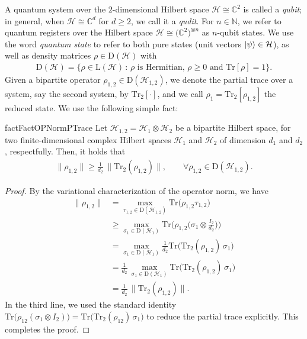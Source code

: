 \documentclass[a4paper,onecolumn,11pt]{quantumarticle}
\theoremstyle{plain}
\begin{document}
A quantum system over the $2$-dimensional Hilbert space $\mathcal H \cong \mathbb{C}^2$ is called a \emph{qubit}; in general, when $\mathcal H \cong \mathbb{C}^d$ for $d \geq 2$, we call it a \emph{qudit}. For $n \in \mathbb{N}$, we refer to quantum registers over the Hilbert space $\mathcal H \cong \big(\mathbb{C}^2\big)^{\otimes n}$ as $n$-qubit states. We use the word \emph{quantum state} to refer to both pure states (unit vectors $\ket{\psi} \in \mathcal H$), as well as density matrices $\rho \in \mathrm{D}(\mathcal H)$ with
\begin{align}
\mathrm{D}(\mathcal H) = \{ \rho \in \mathrm{L}(\mathcal{H}) \, : \, \rho \text{ is Hermitian, $\rho \geq 0$ and  } \mathrm{Tr}[\rho] =1\}.    
\end{align}
Given a bipartite operator $\rho_{1,2} \in \mathrm{D}(\mathcal H_{1,2})$, we denote the partial trace over a system, say the second system, by $\mathrm{Tr}_2[\cdot]$, and we call $\rho_1=\mathrm{Tr}_2[\rho_{1,2}]$ the reduced state. We use the following simple fact:
\begin{restatable}{fact}{FactOPNormPTrace} \label{fact:op-norm-ptrace}
    Let $\mathcal H_{1,2} = \mathcal H_{1} \otimes \mathcal H_{2}$ be a bipartite Hilbert space, for two finite-dimensional complex Hilbert spaces $\mathcal H_{1}$ and $\mathcal H_{2}$ of dimension $d_1$ and $d_2$, respectfully. Then, it holds that
    \begin{align}
        \|\rho_{1,2}\| \geq \frac{1}{d_2} \, \|\mathrm{Tr}_2(\rho_{1,2})\|, \quad \quad \forall \rho_{1,2} \in \mathrm{D}(\mathcal H_{1,2}).
        \end{align}
\end{restatable}

\begin{proof}
By the variational characterization of the operator norm, we have
\begin{align*}
\|\rho_{1,2}\| 
&= \max_{\tau_{1,2} \in \mathrm{D}(\mathcal H_{1,2})} \mathrm{Tr}\big(\rho_{1,2} \tau_{1,2}\big) \\
&\ge \max_{\sigma_1 \in \mathrm{D}(\mathcal H_1)} \mathrm{Tr}\Big(\rho_{1,2} \big(\sigma_1 \otimes \frac{I_2}{d_2}\big)\Big) \\
&= \max_{\sigma_1 \in \mathrm{D}(\mathcal H_1)} \frac{1}{d_2} \mathrm{Tr}\big( \mathrm{Tr}_2(\rho_{1,2}) \, \sigma_1 \big) \\
&= \frac{1}{d_2} \, \max_{\sigma_1 \in \mathrm{D}(\mathcal H_1)} \mathrm{Tr}\big( \mathrm{Tr}_2(\rho_{1,2}) \, \sigma_1 \big) \\
&= \frac{1}{d_2} \, \|\mathrm{Tr}_2(\rho_{1,2})\|.
\end{align*}
In the third line, we used the standard identity $\mathrm{Tr}\big(\rho_{12} (\sigma_1 \otimes I_2)\big) = \mathrm{Tr}\big(\mathrm{Tr}_2(\rho_{12}) \, \sigma_1\big)$
to reduce the partial trace explicitly. This completes the proof.
\end{proof}
\end{document}
